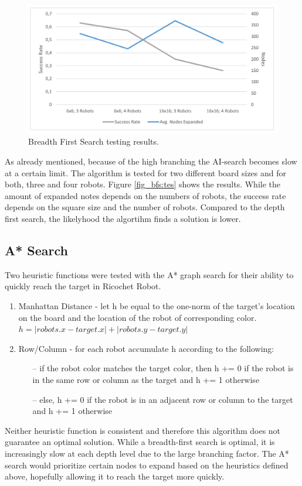 \documentclass[a4paper,10pt]{article}
\begin{document}
  \begin{figure}
  	\centering
  	\label{fig_bfs:test}
  	\includegraphics[scale=0.47]{figures/Bfs_test_results.png}
  	\caption{Breadth First Search testing results.}
  \end{figure}
  
  
  As already mentioned, because of the high branching the AI-search becomes slow at a certain limit. The algorithm is tested for two different board sizes and for both, three and four robots. Figure \ref{fig_bfs:tes} shows the results. While the amount of expanded notes depends on the numbers of robots, the success rate depends on the square size and the number of robots. Compared to the depth first search, the likelyhood the algortihm finds a solution is lower. 

  \subsection{A* Search}
  Two heuristic functions were tested with the A* graph search for their ability to quickly reach the target in Ricochet Robot.
  \begin{enumerate}
    \item Manhattan Distance - let h be equal to the one-norm of the target's location on the board and the location of the robot of corresponding color. \\
    $h = |robots.x - target.x| + |robots.y - target.y|$
    \item Row/Column - for each robot accumulate h according to the following:
    \begin{itemize}
      \item[--] if the robot color matches the target color, then h += 0 if the robot is in the same row or column as the target and h += 1 otherwise
      \item[--] else, h += 0 if the robot is in an adjacent row or column to the target and h += 1 otherwise
    \end{itemize}
  \end{enumerate}
  Neither heuristic function is consistent and therefore this algorithm does not guarantee an optimal solution.  While a breadth-first search is optimal,
  it is increasingly slow at each depth level due to the large branching factor.  The A* search would prioritize certain nodes to expand based on the heuristics
  defined above, hopefully allowing it to reach the target more quickly. \\
\end{document}
